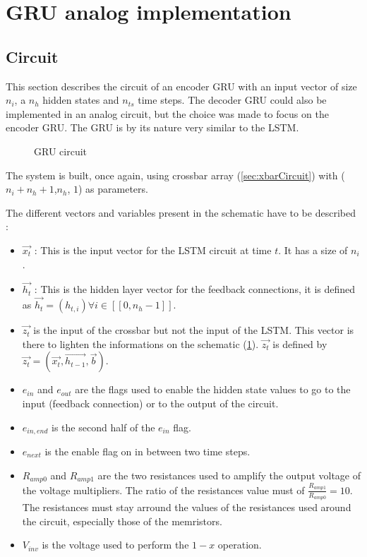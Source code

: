 \section{\acs{GRU} analog implementation}\label{sec:gruCircuit}

\subsection{Circuit}

This section describes the circuit of an encoder \ac{GRU} with an input vector of size $n_i$, a $n_h$ hidden states and $n_{ts}$ time steps. The decoder \ac{GRU} could also be implemented in an analog circuit, but the choice was made to focus on the encoder \ac{GRU}. The \ac{GRU} is by its nature very similar to the \ac{LSTM}.

\begin{figure}[H]
  \centering
  
  \caption{\ac{GRU} circuit}
  \label{circt:lstm}
\end{figure}

The system is built, once again, using crossbar array (\cref{sec:xbarCircuit}) with ($n_i+n_h+1$,$n_h$, $1$) as parameters.

The different vectors and variables present in the schematic have to be described :

\begin{itemize}
  \item $\overrightarrow{x_t}$ : This is the input vector for the \ac{LSTM} circuit at time $t$. It has a size of $n_i$.
  \item $\overrightarrow{h_t}$ : This is the hidden layer vector for the feedback connections, it is defined as $\overrightarrow{h_{t}}=(h_{t,i}) \forall i\in [\![0,n_h-1]\!]$.
  \item $\overrightarrow{z_t}$ is the input of the crossbar but not the input of the \ac{LSTM}. This vector is there to lighten the informations on the schematic (\cref{circt:lstm}). $\overrightarrow{z_t}$ is defined by $\overrightarrow{z_t}=(\overrightarrow{x_t},\overrightarrow{h_{t-1}},\overrightarrow{b})$.
  \item $e_{in}$ and $e_{out}$ are the flags used to enable the hidden state values to go to the input (feedback connection) or to the output of the circuit.
  \item $e_{in,end}$ is the second half of the $e_{in}$ flag.
  \item $e_{next}$ is the enable flag on in between two time steps.
  \item $R_{amp0}$ and $R_{amp1}$ are the two resistances used to amplify the output voltage of the voltage multipliers. The ratio of the resistances value must of $\frac{R_{amp1}}{R_{amp0}}=10$. The resistances must stay arround the values of the resistances used around the circuit, especially those of the memristors.
  \item $V_{inv}$ is the voltage used to perform the $1-x$ operation.
\end{itemize}

